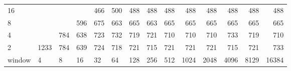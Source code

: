 \begin{table}[h]
{\begin{tabular}{lrrrrrrrrrrrrr}
			\multicolumn{1}{|l|}{16} &  &  &  & \cellcolor[HTML]{E69900}466 & \cellcolor[HTML]{E69900}500 & \cellcolor[HTML]{E69900}488 & \cellcolor[HTML]{E69900}488 & \cellcolor[HTML]{E69900}488 & \cellcolor[HTML]{E69900}488 & \cellcolor[HTML]{E69900}488 & \cellcolor[HTML]{E69900}488 & \cellcolor[HTML]{E69900}488 & \cellcolor[HTML]{E69900}488 \\ \cline{1-1}
			\multicolumn{1}{|l|}{8} &  &  & \cellcolor[HTML]{E69900}596 & \cellcolor[HTML]{E60000}675 & \cellcolor[HTML]{E60000}663 & \cellcolor[HTML]{E60000}665 & \cellcolor[HTML]{E60000}663 & \cellcolor[HTML]{E60000}665 & \cellcolor[HTML]{E60000}665 & \cellcolor[HTML]{E60000}665 & \cellcolor[HTML]{E60000}665 & \cellcolor[HTML]{E60000}665 & \cellcolor[HTML]{E60000}665 \\ \cline{1-1}
			\multicolumn{1}{|l|}{4} &  & \cellcolor[HTML]{E60000}784 & \cellcolor[HTML]{E60000}638 & \cellcolor[HTML]{E60000}723 & \cellcolor[HTML]{E60000}732 & \cellcolor[HTML]{E60000}719 & \cellcolor[HTML]{E60000}721 & \cellcolor[HTML]{E60000}710 & \cellcolor[HTML]{E60000}710 & \cellcolor[HTML]{E60000}710 & \cellcolor[HTML]{E60000}733 & \cellcolor[HTML]{E60000}719 & \cellcolor[HTML]{E60000}710 \\ \cline{1-1}
			\multicolumn{1}{|l|}{2} & \cellcolor[HTML]{4C00E6}1233 & \cellcolor[HTML]{E60000}784 & \cellcolor[HTML]{E60000}639 & \cellcolor[HTML]{E60000}724 & \cellcolor[HTML]{E60000}718 & \cellcolor[HTML]{E60000}721 & \cellcolor[HTML]{E60000}715 & \cellcolor[HTML]{E60000}721 & \cellcolor[HTML]{E60000}721 & \cellcolor[HTML]{E60000}721 & \cellcolor[HTML]{E60000}715 & \cellcolor[HTML]{E60000}721 & \cellcolor[HTML]{E60000}733 \\ \hline
			\multicolumn{1}{l|}{window} & \multicolumn{1}{l|}{4} & \multicolumn{1}{l|}{8} & \multicolumn{1}{l|}{16} & \multicolumn{1}{l|}{32} & \multicolumn{1}{l|}{64} & \multicolumn{1}{l|}{128} & \multicolumn{1}{l|}{256} & \multicolumn{1}{l|}{512} & \multicolumn{1}{l|}{1024} & \multicolumn{1}{l|}{2048} & \multicolumn{1}{l|}{4096} & \multicolumn{1}{l|}{8129} & \multicolumn{1}{l|}{16384} \\ \cline{2-14} 
		\end{tabular}
	}
\end{table}


